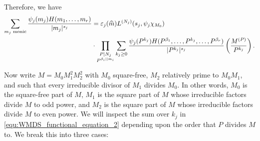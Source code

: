 \documentclass[12pt,reqno,oneside]{amsart}
\begin{document}
    Therefore, we have
    \begin{equation}\label{equ:WMDS_functional_equation_2}
        \begin{aligned}
            \sum_{\text{$m_{j}$ monic}}\frac{\psi_{j}(m_{j})H(m_{1},\ldots,m_{r})}{|m_{j}|^{s_{j}}} &= \varepsilon_{j}(\widehat{m})L^{(N_{j})}(s_{j},\psi_{j}\chi_{M_{0}}) \\
            &\cdot \prod_{\substack{P \mid N_{j} \\ P^{\beta_{i} \mid\mid m_{i}}}}\sum_{k_{j} \ge 0}\frac{\psi_{j}(P^{k_{j}})H(P^{\beta_{1}},\ldots,P^{k_{j}},\ldots,P^{\beta_{r}})}{|P^{k_{j}}|^{s_{j}}}\left(\frac{M^{(P)}}{P^{k_{j}}}\right).
        \end{aligned}
    \end{equation}

    Now write $M = M_{0}M_{1}^{2}M_{2}^{2}$ with $M_{0}$ square-free, $M_{2}$ relatively prime to $M_{0}M_{1}$, and such that every irreducible divisor of $M_{1}$ divides $M_{0}$. In other words, $M_{0}$ is the square-free part of $M$, $M_{1}$ is the square part of $M$ whose irreducible factors divide $M$ to odd power, and $M_{2}$ is the square part of $M$ whose irreducible factors divide $M$ to even power. We will inspect the sum over $k_{j}$ in \cref{equ:WMDS_functional_equation_2} depending upon the order that $P$ divides $M$ to. We break this into three cases:
\end{document}
